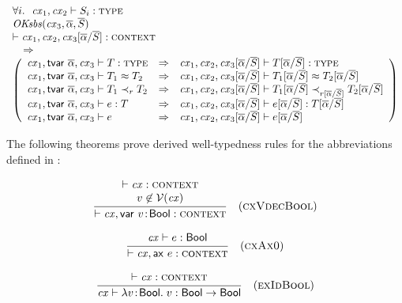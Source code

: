 \begin{theorem}\label{thm-tsbs-jdg}
\[
\begin{array}{l}
\FORALL{i}{\isty{\cx_1,\cx_2}{\typI_i}}
\\
\tsbslashok{\cx_3}{\tvarIS}{\typIS}
\\
\cxwf{\cx_1,\cx_2,\tsbslash{\cx_3}{\tvarIS}{\typIS}}
\\
\ \ \IMPLIES\\
\left(
\begin{array}{l@{\ \ \IMPLIES\ \ }l}
\isty{\cx_1,\tvdec{\tvarIS},\cx_3}{\typ} &
\isty{\cx_1,\cx_2,\tsbslash{\cx_3}{\tvarIS}{\typIS}}
     {\tsbslash{\typ}{\tvarIS}{\typIS}} \\
\teq{\cx_1,\tvdec{\tvarIS},\cx_3}{\typ_1}{\typ_2} &
\teq{\cx_1,\cx_2,\tsbslash{\cx_3}{\tvarIS}{\typIS}}
    {\tsbslash{\typ_1}{\tvarIS}{\typIS}}
    {\tsbslash{\typ_2}{\tvarIS}{\typIS}} \\
\issub{\cx_1,\tvdec{\tvarIS},\cx_3}{\typ_1}{\tspred}{\typ_2} &
\issub{\cx_1,\cx_2,\tsbslash{\cx_3}{\tvarIS}{\typIS}}
      {\tsbslash{\typ_1}{\tvarIS}{\typIS}}
      {\tsbslash{\tspred}{\tvarIS}{\typIS}}
      {\tsbslash{\typ_2}{\tvarIS}{\typIS}} \\
\hasty{\cx_1,\tvdec{\tvarIS},\cx_3}{\expr}{\typ} &
\hasty{\cx_1,\cx_2,\tsbslash{\cx_3}{\tvarIS}{\typIS}}
      {\tsbslash{\expr}{\tvarIS}{\typIS}}
      {\tsbslash{\typ}{\tvarIS}{\typIS}} \\
\theo{\cx_1,\tvdec{\tvarIS},\cx_3}{\expr} &
\theo{\cx_1,\cx_2,\tsbslash{\cx_3}{\tvarIS}{\typIS}}
     {\tsbslash{\expr}{\tvarIS}{\typIS}}
\end{array}
\right)
\end{array}
\]
\end{theorem}

The following theorems prove derived well-typedness rules for the
abbreviations defined in :

\begin{theorem}\label{thm-cxvdecbool}
{\rm
\[
\frac{\begin{array}{c}\vdash\mathit{cx}:\textsc{context}\\v\not\in\mathcal{V}(\mathit{cx})\end{array}}{\vdash\mathit{cx},\mathsf{var}\ v\!:\!\mathsf{Bool}:\textsc{context}}\quad\mbox{(\textsc{cxVdecBool})}
\]
}
\end{theorem}

\begin{theorem}\label{thm-axmono}
{\rm
\[
\frac{\begin{array}{c}\mathit{cx}\vdash e:\mathsf{Bool}\end{array}}{\vdash\mathit{cx},\mathsf{ax}\ e:\textsc{context}}\quad\mbox{(\textsc{cxAx0})}
\]
}
\end{theorem}

\begin{theorem}\label{thm-eidbool}
{\rm
\[
\frac{\begin{array}{c}\vdash\mathit{cx}:\textsc{context}\end{array}}{\mathit{cx}\vdash\lambda v\!:\!\mathsf{Bool}.\;v:\mathsf{Bool}\to\mathsf{Bool}}\quad\mbox{(\textsc{exIdBool})}
\]
}
\end{theorem}


